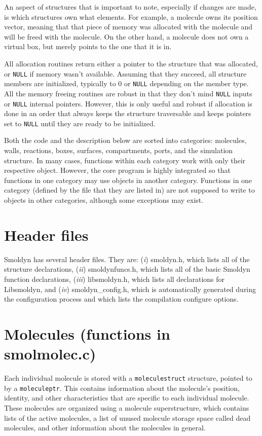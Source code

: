 \documentclass {scrbook}
\newcommand {\ttt} {\texttt}
\begin{document}
An aspect of structures that is important to note, especially if changes are made, is which structures own what elements. For example, a molecule owns its position vector, meaning that that piece of memory was allocated with the molecule and will be freed with the molecule. On the other hand, a molecule does not own a virtual box, but merely points to the one that it is in.

All allocation routines return either a pointer to the structure that was allocated, or \ttt{NULL} if memory wasn't available. Assuming that they succeed, all structure members are initialized, typically to 0 or \ttt{NULL} depending on the member type. All the memory freeing routines are robust in that they don't mind \ttt{NULL} inputs or \ttt{NULL} internal pointers. However, this is only useful and robust if allocation is done in an order that always keeps the structure traversable and keeps pointers set to \ttt{NULL} until they are ready to be initialized.

Both the code and the description below are sorted into categories: molecules, walls, reactions, boxes, surfaces, compartments, ports, and the simulation structure. In many cases, functions within each category work with only their respective object. However, the core program is highly integrated so that functions in one category may use objects in another category. Functions in one category (defined by the file that they are listed in) are not supposed to write to objects in other categories, although some exceptions may exist.

\section{Header files}

Smoldyn has several header files. They are: (\emph{i}) smoldyn.h, which lists all of the structure declarations, (\emph{ii}) smoldynfuncs.h, which lists all of the basic Smoldyn function declarations, (\emph{iii}) libsmoldyn.h, which lists all declarations for Libsmoldyn, and (\emph{iv}) smoldyn\_config.h, which is automatically generated during the configuration process and which lists the compilation configure options.

\section{Molecules (functions in smolmolec.c)}

Each individual molecule is stored with a \ttt{moleculestruct} structure, pointed to by a \ttt{moleculeptr}. This contains information about the molecule's position, identity, and other characteristics that are specific to each individual molecule. These molecules are organized using a molecule superstructure, which contains lists of the active molecules, a list of unused molecule storage space called dead molecules, and other information about the molecules in general.
\end{document}
